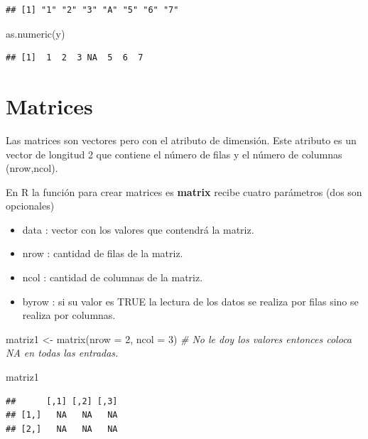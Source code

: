 \documentclass[
  12pt,
]{book}
\newenvironment{Shaded}{\begin{snugshade}}{\end{snugshade}}
\newcommand{\AttributeTok}[1]{\textcolor[rgb]{0.77,0.63,0.00}{#1}}
\newcommand{\CommentTok}[1]{\textcolor[rgb]{0.56,0.35,0.01}{\textit{#1}}}
\newcommand{\DecValTok}[1]{\textcolor[rgb]{0.00,0.00,0.81}{#1}}
\newcommand{\FunctionTok}[1]{\textcolor[rgb]{0.00,0.00,0.00}{#1}}
\newcommand{\NormalTok}[1]{#1}
\newcommand{\OtherTok}[1]{\textcolor[rgb]{0.56,0.35,0.01}{#1}}
\providecommand{\tightlist}{%
  \setlength{\itemsep}{0pt}\setlength{\parskip}{0pt}}
\begin{document}
\begin{verbatim}
## [1] "1" "2" "3" "A" "5" "6" "7"
\end{verbatim}

\begin{Shaded}
\begin{Highlighting}[]
\FunctionTok{as.numeric}\NormalTok{(y)}
\end{Highlighting}
\end{Shaded}

\begin{verbatim}
## [1]  1  2  3 NA  5  6  7
\end{verbatim}

\hypertarget{matrices}{%
\section{\texorpdfstring{\textbf{Matrices}}{Matrices}}\label{matrices}}

Las matrices son vectores pero con el atributo de dimensión. Este atributo es un vector de longitud 2 que contiene el número de filas y el número de columnas (nrow,ncol).

En R la función para crear matrices es \textbf{matrix} recibe cuatro parámetros (dos son opcionales)

\begin{itemize}
\tightlist
\item
  data : vector con los valores que contendrá la matriz.
\item
  nrow : cantidad de filas de la matriz.
\item
  ncol : cantidad de columnas de la matriz.
\item
  byrow : si su valor es TRUE la lectura de los datos se realiza por filas sino se realiza por columnas.
\end{itemize}

\begin{Shaded}
\begin{Highlighting}[]
\NormalTok{matriz1 }\OtherTok{\textless{}{-}} \FunctionTok{matrix}\NormalTok{(}\AttributeTok{nrow =} \DecValTok{2}\NormalTok{, }\AttributeTok{ncol =} \DecValTok{3}\NormalTok{) }\CommentTok{\# No le doy los valores entonces coloca NA en todas las entradas.}

\NormalTok{matriz1}
\end{Highlighting}
\end{Shaded}

\begin{verbatim}
##      [,1] [,2] [,3]
## [1,]   NA   NA   NA
## [2,]   NA   NA   NA
\end{verbatim}
\end{document}
